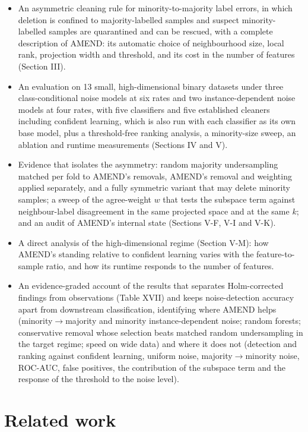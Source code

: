 \documentclass[conference]{IEEEtran}
\begin{document}
\begin{itemize}
\item An asymmetric cleaning rule for minority-to-majority label errors, in which deletion is confined to majority-labelled samples and suspect minority-labelled samples are quarantined and can be rescued, with a complete description of AMEND: its automatic choice of neighbourhood size, local rank, projection width and threshold, and its cost in the number of features (Section III).
\item An evaluation on 13 small, high-dimensional binary datasets under three class-conditional noise models at six rates and two instance-dependent noise models at four rates, with five classifiers and five established cleaners including confident learning, which is also run with each classifier as its own base model, plus a threshold-free ranking analysis, a minority-size sweep, an ablation and runtime measurements (Sections IV and V).
\item Evidence that isolates the asymmetry: random majority undersampling matched per fold to AMEND's removals, AMEND's removal and weighting applied separately, and a fully symmetric variant that may delete minority samples; a sweep of the agree-weight $w$ that tests the subspace term against neighbour-label disagreement in the same projected space and at the same $k$; and an audit of AMEND's internal state (Sections V-F, V-I and V-K).
\item A direct analysis of the high-dimensional regime (Section V-M): how AMEND's standing relative to confident learning varies with the feature-to-sample ratio, and how its runtime responds to the number of features.
\item An evidence-graded account of the results that separates Holm-corrected findings from observations (Table XVII) and keeps noise-detection accuracy apart from downstream classification, identifying where AMEND helps (minority$\rightarrow $majority and minority instance-dependent noise; random forests; conservative removal whose selection beats matched random undersampling in the target regime; speed on wide data) and where it does not (detection and ranking against confident learning, uniform noise, majority$\rightarrow $minority noise, ROC-AUC, false positives, the contribution of the subspace term and the response of the threshold to the noise level).
\end{itemize}

\section{Related work}\label{sec:related-work}
\end{document}
